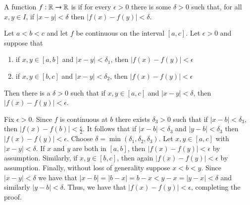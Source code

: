 \documentclass[12pt]{report}
\begin{document}
\begin{defn}{}{}
    A function $f:\mathbb R\rightarrow \mathbb R$ is  if for every $\epsilon > 0$ there is some $\delta > 0$ such that, for all $x,y \in I$, if $|x-y| < \delta$ then $|f(x) - f(y)| < \delta$.
\end{defn}


\begin{lem}{}{}
    Let $a < b < c$ and let $f$ be continuous on the interval $[a,c]$. Let $\epsilon > 0$ and suppose that \begin{enumerate}
        \item if $x,y \in [a,b]$ and $|x-y| < \delta_1$, then $|f(x) - f(y)| < \epsilon$
        \item if $x,y \in [b,c]$ and $|x-y| < \delta_2$, then $|f(x) - f(y)| < \epsilon$
    \end{enumerate}
    Then there is a $\delta > 0$ such that if $x,y \in [a,c]$ and $|x-y| < \delta$, then $|f(x) - f(y)| < \epsilon$.
\end{lem}
\begin{proof*}{}{}
    Fix $\epsilon > 0$. Since $f$ is continuous at $b$ there exists $\delta_3 > 0$ such that if $|x-b| < \delta_3$, then $|f(x) - f(b)| < \frac{\epsilon}{2}$. It follows that if $|x-b| < \delta_3$ and $|y-b| < \delta_3$ then $|f(x) - f(y)| < \epsilon$. Choose $\delta = \min(\delta_1,\delta_2,\delta_3)$. Let $x,y \in [a,c]$ with $|x-y| < \delta$. If $x$ and $y$ are both in $[a,b]$, then $|f(x) - f(y)| < \epsilon$ by assumption. Similarly, if $x,y \in [b,c]$, then again $|f(x) - f(y)| < \epsilon$ by assumption. Finally, without loss of generality suppose $x < b < y$. Since $|x-y| < \delta$ we have that $|x-b| = |b-x| = b-x < y-x = |y-x| < \delta$ and similarly $|y-b| < \delta$. Thus, we have that $|f(x) - f(y)| < \epsilon$, completing the proof.
\end{proof*}
\end{document}
